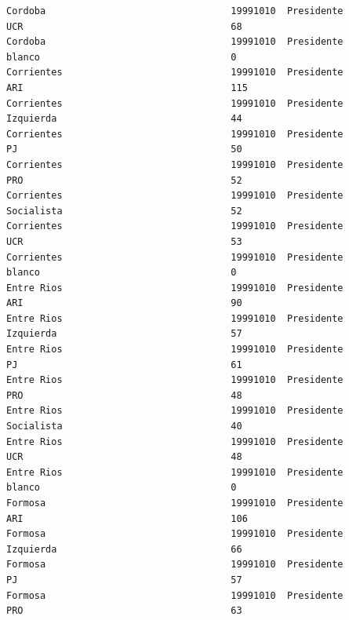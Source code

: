 \documentclass[a4paper,10pt]{article}
\begin{document}
\begin{verbatim}
Cordoba                                 19991010  Presidente                    UCR                                     68             
Cordoba                                 19991010  Presidente                    blanco                                  0              
Corrientes                              19991010  Presidente                    ARI                                     115            
Corrientes                              19991010  Presidente                    Izquierda                               44             
Corrientes                              19991010  Presidente                    PJ                                      50             
Corrientes                              19991010  Presidente                    PRO                                     52             
Corrientes                              19991010  Presidente                    Socialista                              52             
Corrientes                              19991010  Presidente                    UCR                                     53             
Corrientes                              19991010  Presidente                    blanco                                  0              
Entre Rios                              19991010  Presidente                    ARI                                     90             
Entre Rios                              19991010  Presidente                    Izquierda                               57             
Entre Rios                              19991010  Presidente                    PJ                                      61             
Entre Rios                              19991010  Presidente                    PRO                                     48             
Entre Rios                              19991010  Presidente                    Socialista                              40             
Entre Rios                              19991010  Presidente                    UCR                                     48             
Entre Rios                              19991010  Presidente                    blanco                                  0              
Formosa                                 19991010  Presidente                    ARI                                     106            
Formosa                                 19991010  Presidente                    Izquierda                               66             
Formosa                                 19991010  Presidente                    PJ                                      57             
Formosa                                 19991010  Presidente                    PRO                                     63             

\end{verbatim}
\end{document}
